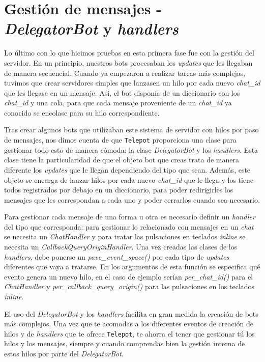\documentclass[oneside]{memoir}
\begin{document}
\section{Gestión de mensajes - \textit{DelegatorBot} y \textit{handlers}}
Lo último con lo que hicimos pruebas en esta primera fase fue con la gestión del servidor. En un principio, nuestros bots procesaban los \textit{updates} que les llegaban de manera secuencial. Cuando ya empezaron a realizar tareas más complejas, tuvimos que crear servidores simples que lanzasen un hilo por cada nuevo \textit{chat\_id} que les llegase en un mensaje. Así, el bot disponía de un diccionario con los \textit{chat\_id} y una cola, para que cada mensaje proveniente de un \textit{chat\_id} ya conocido se encolase para su hilo correspondiente.

Tras crear algunos bots que utilizaban este sistema de servidor con hilos por paso de mensajes, nos dimos cuenta de que \texttt{Telepot} proporciona una clase para gestionar todo esto de manera cómoda: la clase \textit{DelegatorBot} y los \textit{handlers}. Esta clase tiene la particularidad de que el objeto bot que creas trata de manera diferente los \textit{updates} que le llegan dependiendo del tipo que sean. Además, este objeto se encarga de lanzar hilos por cada nuevo \textit{chat\_id} que le llega y los tiene todos registrados por debajo en un diccionario, para poder redirigirles los mensajes que les correspondan a cada uno y poder cerrarlos cuando sea necesario.

Para gestionar cada mensaje de una forma u otra es necesario definir un \textit{handler} del tipo que corresponda: para gestionar lo relacionado con mensajes en un \textit{chat} se necesita un \textit{ChatHandler} y para tratar las pulsaciones en teclados \textit{inline} se necesita un \textit{CallbackQueryOriginHandler}. Una vez creadas las clases de los \textit{handlers}, debe ponerse un \textit{pave\_event\_space()} por cada tipo de \textit{updates} diferentes que vaya a tratarse. En los argumentos de esta función se especifica qué evento genera un nuevo hilo, en el caso de ejemplo serían \textit{per\_chat\_id()} para el \textit{ChatHandler} y \textit{per\_callback\_query\_origin()} para las pulsaciones en los teclados \textit{inline}. 

El uso del \textit{DelegatorBot} y los \textit{handlers} facilita en gran medida la creación de bots más complejos. Una vez que te acomodas a los diferentes eventos de creación de hilos y de \textit{handlers} que te ofrece \texttt{Telepot}, te ahorra el tener que gestionar tú los hilos y los mensajes, siempre y cuando comprendas bien la gestión interna de estos hilos por parte del \textit{DelegatorBot}.
\end{document}
